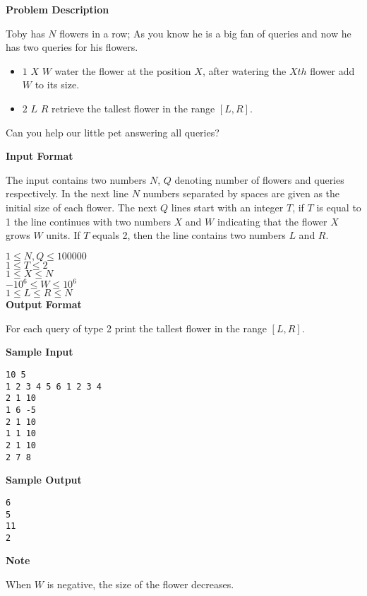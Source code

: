 \textbf{\large Problem Description}

Toby has $N$ flowers in a row; As you know he is a big fan of queries and now
he has two queries for his flowers.

\begin{itemize}
    \item $1$ $X$ $W$ water the flower at the position $X$, after watering the $Xth$ flower add $W$ to its size.
    \item $2$ $L$ $R$ retrieve the tallest flower in the range $[L, R]$.
\end{itemize}

Can you help our little pet answering all queries?

\textbf{\large Input Format}

The input contains two numbers $N$, $Q$ denoting number of flowers and queries
respectively. In the next line $N$ numbers separated by spaces are given as the initial size of each flower.
The next $Q$ lines start with an integer $T$, if $T$ is equal to 1 the line continues with
two numbers $X$ and $W$ indicating that the flower $X$ grows $W$ units. If $T$ equals 2, then
the line contains two numbers $L$ and $R$.

$1 \le N, Q \le 100000$ \\
$1 \le T \le 2 $\\
$1 \le X \le N$ \\
$-10^6 \le W \le 10^6$\\
$1 \le L \le R \le N $\\

\textbf{\large Output Format}

For each query of type 2 print the tallest flower in the range $[L, R]$.

\textbf{\large Sample Input}

\begin{verbatim}
10 5
1 2 3 4 5 6 1 2 3 4
2 1 10
1 6 -5
2 1 10
1 1 10
2 1 10
2 7 8
\end{verbatim}

\textbf{\large Sample Output}

\begin{verbatim}
6
5
11
2
\end{verbatim}

\textbf{\large Note}

When $W$ is negative, the size of the flower decreases.

\newpage
